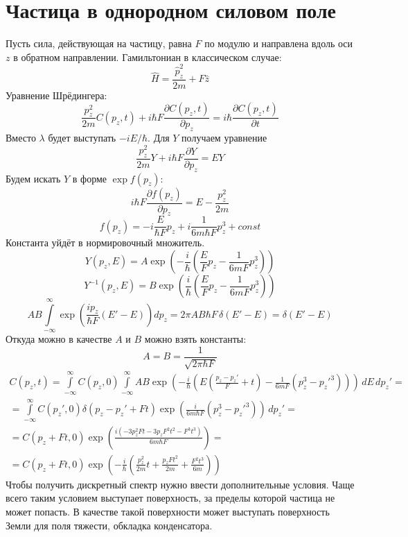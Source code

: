 \section{Частица в однородном силовом поле}

Пусть сила, действующая на частицу, равна $F$ по модулю и направлена вдоль оси $z$ в обратном направлении. Гамильтониан в классическом случае:
\[
	\hat{H} = \frac{\hat{p}_z^2}{2m} + F \hat{z} 
\]
Уравнение Шрёдингера:
\[
	\frac{p_z^2}{2m} C(p_z, t) + i \hbar F \frac{\partial C(p_z, t)}{\partial p_z} = i\hbar \frac{\partial C(p_z, t)}{\partial t}
\]
Вместо $\lambda$ будет выступать $-iE/\hbar$. Для $Y$ получаем уравнение
\[
	\frac{p_z^2}{2m} Y + i \hbar F \frac{\partial Y}{\partial p_z} = E Y
\]
Будем искать $Y$ в форме $\exp f(p_z)$:
\[
	i \hbar F \frac{\partial f(p_z)}{\partial p_z} = E - \frac{p_z^2}{2m}
\]
\[
	f(p_z) = - i \frac{E}{\hbar F} p_z + i \frac{1}{6 m \hbar F} p_z^3 + const
\]
Константа уйдёт в нормировочный множитель. 
\[
	Y(p_z, E) = A \exp \left(-\frac{i}{\hbar} \left( \frac{E}{F} p_z - \frac{1}{6 m F} p_z^3 \right) \right)
\]
\[
	Y^{-1}(p_z, E) = B \exp \left(\frac{i}{\hbar} \left( \frac{E}{F} p_z - \frac{1}{6 m F} p_z^3 \right) \right)
\]
\[
	AB \int\limits_{-\infty}^{\infty} \exp \left(\frac{i p_z}{\hbar F} (E' - E) \right) dp_z = 
	2\pi AB\hbar F\, \delta(E' - E) = \delta(E' - E)
\]
Откуда можно в качестве $A$ и $B$ можно взять константы:
\[
	A = B = \frac{1}{\sqrt{2\pi \hbar F}}
\]
\[
	\begin{gathered}
		C(p_z, t) = \int\limits_{-\infty}^{\infty} C(p_z, 0) \int\limits_{-\infty}^{\infty} AB
		\exp \left(-\frac{i}{\hbar} \left( E \left(\frac{p_z - p_z'}{F} + t\right) - \frac{1}{6 m F} (p_z^3 - p_z'^3) \right)
		\right)\, dE\, dp_z' = \\
		=
		\int\limits_{-\infty}^{\infty} C(p_z', 0) \delta(p_z - p_z' + F t) 
		\exp \left(\frac{i}{6 m \hbar F} (p_z^3 - p_z'^3) \right)
		\, dp_z' = \\
		=
		C(p_z + F t, 0) \exp \left(\frac{i(-3 p_z^2 F t - 3 p_z F^2 t^2 - F^3 t^3)}{6 m \hbar F} \right) = \\
		=
		C(p_z + F t, 0) \exp \left(-\frac{i}{\hbar} \left(\frac{p_z^2}{2m} t + \frac{p_z F t^2}{2 m} + \frac{F^2 t^3}{6 m}\right) \right)
	\end{gathered}
\]
Чтобы получить дискретный спектр нужно ввести дополнительные условия. Чаще всего таким условием выступает поверхность, за пределы которой частица не может попасть. В качестве такой поверхности может выступать поверхность Земли для поля тяжести, обкладка конденсатора.

